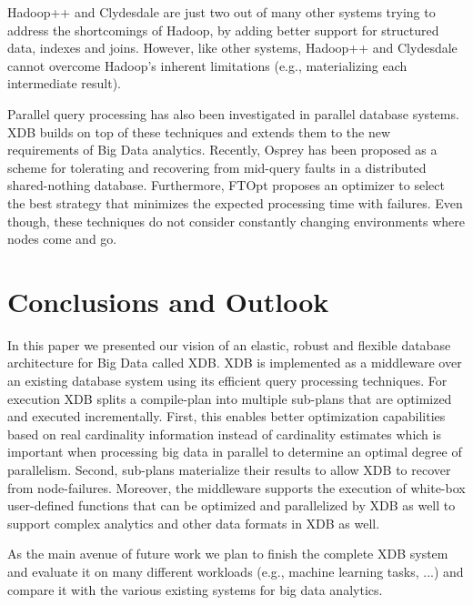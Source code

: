 \documentclass{sig-alternate}
\begin{document}
Hadoop++ \cite{HadoopPP:PVLDB:2010} and 	Clydesdale \cite{Clydesdale:EDBT:2012} are just two out of many other systems trying to address the shortcomings of Hadoop, by adding better support for structured data, indexes and joins. However, like other systems, Hadoop++ and Clydesdale cannot overcome Hadoop's inherent limitations (e.g., materializing each intermediate result).

Parallel query processing has also been investigated in parallel database systems. XDB builds on top of these techniques and extends them to the new requirements of Big Data analytics. Recently, Osprey \cite{Osprey:EDBT:2012} has been proposed as a scheme for tolerating and recovering from mid-query faults in a distributed shared-nothing database. Furthermore, FTOpt \cite{FOpt:SIGMOD:2011} proposes an optimizer to select the best strategy that minimizes the expected processing time with failures. Even though, these techniques do not consider constantly changing environments where nodes come and go.

\section{Conclusions and Outlook}
\label{sec:concl}

In this paper we presented our vision of an elastic, robust and flexible database architecture for Big Data called XDB. XDB is implemented as a middleware over an existing database system using its efficient query processing techniques. 
For execution XDB splits a compile-plan into multiple sub-plans that are optimized and executed incrementally. First, this enables better optimization capabilities based on real cardinality information instead of cardinality estimates which is important when processing big data in parallel to determine an optimal degree of parallelism. Second, sub-plans materialize their results to allow XDB to recover from node-failures. Moreover, the middleware supports the execution of white-box user-defined functions that can be optimized and parallelized by XDB as well to support complex analytics and other data formats in XDB as well.

As the main avenue of future work we plan to finish the complete XDB system and evaluate it on many different workloads (e.g., machine learning tasks, ...) and compare it with the various existing systems for big data analytics.


\small
\end{document}

